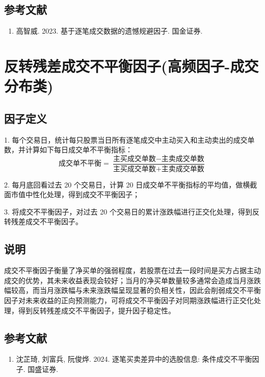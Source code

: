 \documentclass{article}
\begin{document}
\subsection{参考文献}
\begin{enumerate}
    \item 高智威. 2023. 基于逐笔成交数据的遗憾规避因子. 国金证券.
\end{enumerate}

\section{反转残差成交不平衡因子(高频因子-成交分布类)}

\subsection{因子定义}

1. 每个交易日，统计每只股票当日所有逐笔成交中主动买入和主动卖出的成交单数，并计算如下每日成交单不平衡指标：
\begin{equation}
    \text{成交单不平衡} = \frac{\text{主买成交单数} - \text{主卖成交单数}}{\text{主买成交单数} + \text{主卖成交单数}}
\end{equation}

2. 每月底回看过去 20 个交易日，计算 20 日成交单不平衡指标的平均值，做横截面市值中性化处理，得到成交不平衡因子；

3. 将成交不平衡因子，对过去 20 个交易日的累计涨跌幅进行正交化处理，得到反转残差成交不平衡因子。

\subsection{说明}
成交不平衡因子衡量了净买单的强弱程度，若股票在过去一段时间是买方占据主动成交的优势，其未来收益表现会较好；当月的净买单数量较多通常会造成当月涨跌幅较高，而当月涨跌幅与未来涨跌幅呈现显著的负相关性，因此会削弱成交不平衡因子对未来收益的正向预测能力，可将成交不平衡因子对同期涨跌幅进行正交化处理，得到反转残差成交不平衡因子，提升因子稳定性。

\subsection{参考文献}
\begin{enumerate}
    \item 沈芷琦, 刘富兵, 阮俊烨. 2024. 逐笔买卖差异中的选股信息: 条件成交不平衡因子. 国盛证券.
\end{enumerate}
\end{document}
